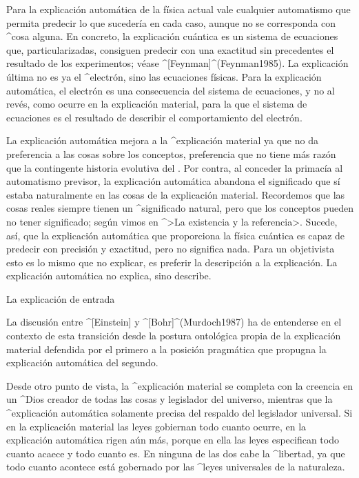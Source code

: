 Para la explicación automática de la física actual vale cualquier
automatismo que permita predecir lo que sucedería en cada
caso, aunque no se corresponda con ^{cosa} alguna.
En concreto, la explicación cuántica es un sistema de ecuaciones
que, particularizadas, consiguen predecir con una exactitud sin
precedentes el resultado de los experimentos; véase
^[Feynman]^(Feynman1985). La explicación última no es ya el ^{electrón},
sino las ecuaciones físicas. Para la explicación automática, el electrón
es una consecuencia del sistema de ecuaciones, y no al revés, como
ocurre en la explicación material, para la que el sistema de ecuaciones
es el resultado de describir el comportamiento del electrón.

La explicación automática mejora a la ^{explicación material} ya que no
da preferencia a las cosas sobre los conceptos, preferencia que no tiene
más razón que la contingente historia evolutiva del . Por contra, al conceder la primacía al automatismo previsor,
la explicación automática abandona el significado que sí estaba
naturalmente en las cosas de la explicación material. Recordemos que las
cosas reales siempre tienen un ^{significado} natural, pero que los
conceptos pueden no tener significado; según vimos en ^>La existencia y
la referencia>. Sucede, así, que la explicación automática que
proporciona la física cuántica es capaz de predecir con precisión y
exactitud, pero no significa nada. Para un objetivista esto es lo mismo
que no explicar, es preferir la descripción a la explicación. La
explicación automática no explica, sino describe.


\Section La explicación de entrada

La discusión entre ^[Einstein] y ^[Bohr]^(Murdoch1987) ha de entenderse
en el contexto de esta transición desde la postura ontológica propia de
la explicación material defendida por el primero a la posición
pragmática que propugna la explicación automática del segundo.

Desde otro punto de vista, la ^{explicación material} se completa con la
creencia en un ^{Dios} creador de todas las cosas y legislador del
universo, mientras que la ^{explicación automática} solamente precisa
del respaldo del legislador universal. Si en la explicación material las
leyes gobiernan todo cuanto ocurre, en la explicación automática rigen
aún más, porque en ella las leyes especifican todo cuanto acaece y todo
cuanto es. En ninguna de las dos cabe la ^{libertad}, ya que todo cuanto
acontece está gobernado por las ^{leyes universales} de la naturaleza.


